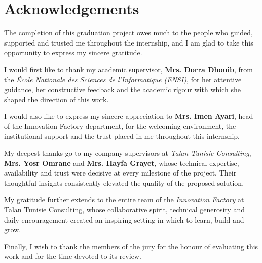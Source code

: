 \chapter*{Acknowledgements}
\thispagestyle{empty}
\begin{singlespace}

\vspace{1cm}

\noindent The completion of this graduation project owes much to the
people who guided, supported and trusted me throughout the internship,
and I am glad to take this opportunity to express my sincere gratitude.

\bigskip

\noindent I would first like to thank my academic supervisor,
\textbf{Mrs. Dorra Dhouib}, from the \textit{École Nationale des Sciences
de l'Informatique (ENSI)}, for her attentive guidance, her constructive
feedback and the academic rigour with which she shaped the direction of
this work.

\bigskip

\noindent I would also like to express my sincere appreciation to
\textbf{Mrs. Imen Ayari}, head of the Innovation Factory department, for
the welcoming environment, the institutional support and the trust placed
in me throughout this internship.

\bigskip

\noindent My deepest thanks go to my company supervisors at
\textit{Talan Tunisie Consulting}, \textbf{Mrs. Yosr Omrane} and
\textbf{Mrs. Hayfa Grayet}, whose technical expertise, availability and
trust were decisive at every milestone of the project. Their thoughtful
insights consistently elevated the quality of the proposed solution.

\bigskip

\noindent My gratitude further extends to the entire team of the
\textit{Innovation Factory} at Talan Tunisie Consulting, whose
collaborative spirit, technical generosity and daily encouragement created
an inspiring setting in which to learn, build and grow.

\bigskip

\noindent Finally, I wish to thank the members of the jury for the honour
of evaluating this work and for the time devoted to its review.
\end{singlespace}
